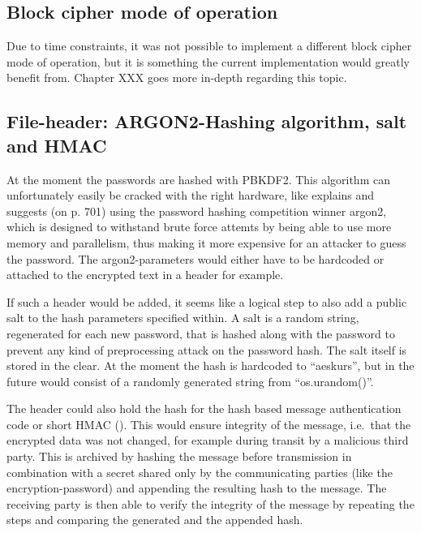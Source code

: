 \hypertarget{block-cipher-mode-of-operation}{%
\subsection{Block cipher mode of
operation}\label{block-cipher-mode-of-operation}}

Due to time constraints, it was not possible to implement a different
block cipher mode of operation, but it is something the current
implementation would greatly benefit from. Chapter XXX goes more
in-depth regarding this topic.

\hypertarget{file-header-argon2-hashing-algorithm-salt-and-hmac}{%
\subsection{File-header: ARGON2-Hashing algorithm, salt and
HMAC}\label{file-header-argon2-hashing-algorithm-salt-and-hmac}}

At the moment the passwords are hashed with PBKDF2. This algorithm can
unfortunately easily be cracked with the right hardware, like \cite[p. 697]{appcrypt} explains and suggests (on p. 701) using the password hashing
competition winner argon2, which is designed to withstand brute force
attemts by being able to use more memory and parallelism, thus making it
more expensive for an attacker to guess the password. The
argon2-parameters would either have to be hardcoded or attached to the
encrypted text in a header for example.

If such a header would be added, it seems like a logical step to also
add a public salt to the hash parameters specified within. A salt is a
random string, regenerated for each new password, that is hashed along
with the password to prevent any kind of preprocessing attack on the
password hash. The salt itself is stored in the clear. \cite[p. 693]{appcrypt} At
the moment the hash is hardcoded to ``aeskurs'', but in the future would
consist of a randomly generated string from ``os.urandom()''.

The header could also hold the hash for the hash based message
authentication code or short HMAC (\cite[ch. 12.2.3]{paar}). This would ensure
integrity of the message, i.e.~that the encrypted data was not changed,
for example during transit by a malicious third party. This is archived
by hashing the message before transmission in combination with a secret
shared only by the communicating parties (like the encryption-password)
and appending the resulting hash to the message. The receiving party is
then able to verify the integrity of the message by repeating the steps
and comparing the generated and the appended hash.

